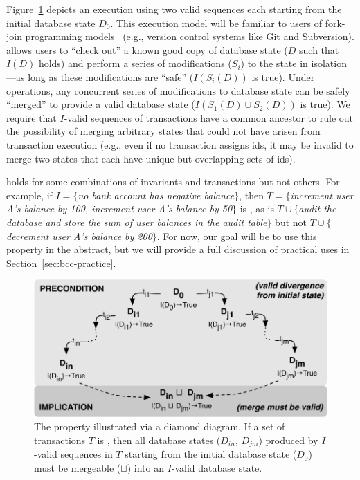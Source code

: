 Figure~\ref{fig:iconfluence} depicts an \iconfluent execution using
two valid sequences each starting from the initial database state
$D_0$. This execution model will be familiar to users of fork-join
programming models~\cite{hewitt-forkjoin} (e.g., version control
systems like Git and Subversion). \iconfluence allows users to ``check
out'' a known good copy of database state ($D$ such that $I(D)$ holds)
and perform a series of modifications ($S_i$) to the state in
isolation---as long as these modifications are ``safe'' ($I(S_i(D))$
is true). Under \iconfluent operations, any concurrent series of
modifications to database state can be safely ``merged'' to provide a
valid database state ($I(S_1(D) \cup S_2(D))$ is true). We require
that $I$-valid sequences of transactions have a common ancestor to
rule out the possibility of merging arbitrary states that could not
have arisen from transaction execution (e.g., even if no transaction
assigns ids, it may be invalid to merge two states that each have
unique but overlapping sets of ids).

\iconfluence holds for some combinations of invariants and
transactions but not others. For example, if $I=\{$\textit{no bank
  account has negative balance}$\}$, then $T=\{$\textit{increment user
  A's balance by 100, increment user A's balance by 50}$\}$ is
\iconfluent, as is $T\cup\{$\textit{audit the database and store the
  sum of user balances in the \textrm{audit} table}$\}$ but not
$T\cup\{$\textit{decrement user A's balance by 200}$\}$. For now, our
goal will be to use this property in the abstract, but we will provide
a full discussion of practical uses in Section~\ref{sec:bcc-practice}.

\begin{figure}
\begin{center}
\includegraphics[width=\columnwidth]{figs/icommute.pdf}\vspace{-1em}
\end{center}
\caption{The \iconfluence property illustrated via a diamond
  diagram. If a set of transactions $T$ is \iconfluent, then all
  database states ($D_{in}$, $D_{jm}$) produced by $I$-valid sequences
  in $T$ starting from the initial database state ($D_0$) must be
  mergeable ($\sqcup$) into an $I$-valid database state.}
\label{fig:iconfluence}
\end{figure}

